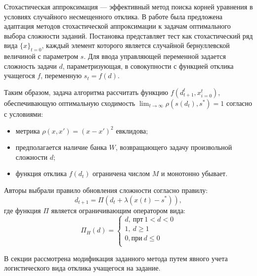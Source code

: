 Стохастическая аппроксимация --- эффективный метод поиска корней уравнения в условиях случайного несмещенного отклика. В работе
\cite{yazidi2020balanced} была предложена адаптация методов стохастической аппроксимации к задачам оптимального выбора 
сложности заданий. Постановка представляет тест как стохастический ряд вида $\{x\}_{t=0}$, каждый элемент которого является случайной бернуллевской величиной с параметром $s$. 
Для ввода управляющей переменной задается сложность задачи $d$, параметризующая, 
в совокупности с функцией отклика учащегося $f$, переменную $s_t = f(d)$.

Таким образом, задача алгоритма рассчитать функцию $f(d_{t+1}^t,{x}_{i=0}^t)$, обеспечивающую оптимальную сходимость $\lim_{t \rightarrow \infty} \rho(s(d_t),s^*) =1$ согласно с условиями:
 \begin{itemize}
    \item метрика $\rho(x,x') = (x-x')^2$ евклидова;
    \item предполагается наличие банка $W$, возвращающего задачу произвольной сложности $d$;
    \item функция отклика $f(d_t)$ ограничена числом $M$ и монотонно убывает.
\end{itemize}
Авторы выбрали правило обновления сложности согласно правилу:
\begin{equation}
    d_{t+1} = \Pi(d_t+\lambda (x(t) -s^*)),
    \label{yazidi}
\end{equation}
где функция $\Pi$ является ограничивающим оператором вида: \begin{equation}
    \Pi_H(d) = \left\{
        \begin{array}{ll}
            d,\ \text{прт}\ 1<d<0 \\
            1,\ d\ge 1\\
            0, \text{при} \ d \le 0\\
        \end{array}
    \right.
\end{equation}

В секции рассмотрена модификация заданного метода путем явного учета логистического вида отклика учащегося на задание. 

